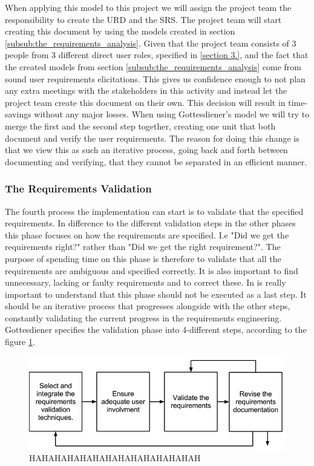 \documentclass[a4paper]{article}
\begin{document}
When applying this model to this project we will assign the project team the responsibility to create the URD and the SRS. The project team will start creating this document by using the models created in section \ref{subsub:the_requirements_analysis}.  Given that the project team consists of 3 people from 3 different direct user roles, specified in \ref{section 3.}, and the fact that the created models from section \ref{subsub:the_requirements_analysis} come from sound user requirements elicitations. This gives us confidence enough to not plan any extra meetings with the stakeholders in this activity and instead let the project team create this document on their own. This decision will result in time-savings without any major losses. When using Gottesdiener's model we will try to merge the first and the second step together, creating one unit that both document and verify the user requirements. The reason for doing this change is that we view this as such an iterative process, going back and forth between documenting and verifying, that they cannot be separated in an efficient manner.  

\subsubsection{The Requirements Validation}
\label{subsub:the_requirements_validation}
The fourth process the implementation can start is to validate that the specified requirements. In difference to the different validation steps in the other phases this phase focuses on how the requirements are specified. I.e "Did we get the requirements right?" rather than "Did we get the right requirement?". The purpose of spending time on this phase is therefore to validate that all the requirements are ambiguous and specified correctly. It is also important to find unnecessary, lacking or faulty requirements and to correct these\cite{gott261262}. In is really important to understand that this phase should not be executed as a last step. It  should be an iterative process that progresses alongside with the other steps, constantly validating the current progress in the requirements engineering\cite{gott261262}. Gottesdiener specifies the validation phase into 4-different steps, according to the figure \ref{figure:validation}\cite{gott261262}. 


\begin{figure}[H]
	\centering
		\includegraphics[width=1\textwidth]{images/validations_model.png}
	\caption{HAHAHAHAHAHAHAHAHAHAHAHAHAH}
	\label{figure:validation}
\end{figure}
\end{document}
